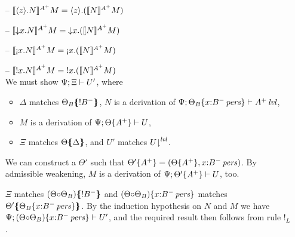 \begin{itemize}
\item[--] $\lsubsta{\tetap{z}{N}}{M}{A^+} 
           = \tetap{z}{(\lsubsta{N}{M}{A^+})}$
\item[--] $\lsubsta{\tdownl{x}{N}}{M}{A^+} 
           = \tdownl{x}{(\lsubsta{N}{M}{A^+})}$
\item[--] $\lsubsta{\tgnabl{x}{N}}{M}{A^+} 
           = \tgnabl{x}{(\lsubsta{N}{M}{A^+})}$
\item[--] $\lsubsta{\tbangl{x}{N}}{M}{A^+} 
           = \tbangl{x}{(\lsubsta{N}{M}{A^+})}$\smallskip\\
  We must show $\foc{\Psi}{\Xi}{U'}$, where
  \begin{itemize}
  \item $\Delta$ matches $\frameoff{\Theta_B}{{!}B^-}$, 
    $N$ is a derivation of
    $\foc{\Psi}{\tackon{\Theta_B}{\ispers{x{:}B^-}}}{\islvl{A^+}}$,
  \item $M$ is a derivation of $\foc{\Psi}{\tackon{\Theta}{A^+}}{U}$,
  \item $\Xi$ matches $\frameoff{\Theta}{\Delta}$, and $U'$ matches 
    $\restrictfrom{U}{\mlvl}$.
  \end{itemize}
  We can construct a $\Theta'$ such that 
  $\tackon{\Theta'}{A^+} = (\tackon{\Theta}{A^+},x{:}\ispers{B^-})$. By
  admissible weakening, $M$ is a derivation of 
  $\foc{\Psi}{\tackon{\Theta'}{A^+}}{U}$, too.

  $\Xi$ matches $\frameoff{(\Theta {\circ} \Theta_B)}{{!}B^-}$ and
  $\tackon{(\Theta {\circ} \Theta_B)}{x{:}\ispers{B^-}}$ matches
  $\frameoff{\Theta'}{\tackon{\Theta_B}{x{:}\ispers{B^-}}}$.
  By the induction hypothesis on $N$ and $M$ we have 
  $\foc{\Psi}{\tackon{(\Theta {\circ}
      \Theta_B)}{x{:}\ispers{B^-}}}{U'}$, and the required
  result then follows from rule ${!}_L$. \smallskip


\end{itemize}
